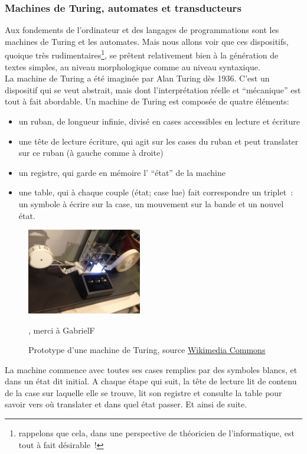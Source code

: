 \documentclass{article}
\begin{document}
			\subsubsection{Machines de Turing, automates et transducteurs}\label{automates}
				Aux fondements de l'ordinateur et des langages de programmations sont les machines de Turing et les automates. Mais nous allons voir que ces dispositifs, quoique très rudimentaires\footnote{rappelons que cela, dans une perspective de théoricien de l'informatique, est tout à fait désirable~!}, se prêtent relativement bien à la génération de textes simples, au niveau morphologique comme au niveau syntaxique.\\
				
				La machine de Turing a été imaginée par Alan Turing dès 1936. C'est un dispositif qui se veut abstrait, mais dont l'interprétation réelle et ``mécanique'' est tout à fait abordable. Un machine de Turing est composée de quatre éléments:
				\begin{itemize}
					\item un ruban, de longueur infinie, divisé en cases accessibles en lecture et écriture
					\item une tête de lecture écriture, qui agit sur les cases du ruban et peut translater sur ce ruban (à gauche comme à droite)
					\item un registre, qui garde en mémoire l' ``état'' de la machine
					\item une table, qui à chaque couple (état; case lue) fait correspondre un triplet~: un symbole à écrire sur la case, un mouvement sur la bande et un nouvel état.
				\end{itemize}
				\begin{figure}
					\centering
					\includegraphics[width=5cm]{turing_machine.jpg}
					\caption{Prototype d'une machine de Turing, source \href{https://commons.wikimedia.org/wiki/File:Model\_of\_a\_Turing\_machine.jpg}{Wikimedia Commons}}, merci à GabrielF
				\end{figure}
				La machine commence avec toutes ses cases remplies par des symboles blancs, et dans un état dit initial. A chaque étape qui suit, la tête de lecture lit de contenu de la case sur laquelle elle se trouve, lit son registre et consulte la table pour savoir vers où translater et dans quel état passer. Et ainsi de suite.\\
\end{document}
